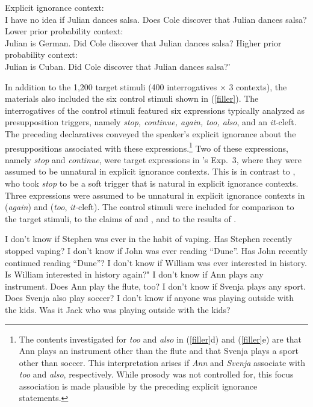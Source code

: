 \documentclass[11pt,fleqn]{article}
\newcommand{\6}{\mbox{$[\hspace*{-.6mm}[$}}
\newcommand{\9}{\mbox{$]\hspace*{-.6mm}]$}}
\newcommand{\citepos}[1]{\citeauthor{#1}'s \citeyear{#1}}
\begin{document}
\begin{exe}
\ex\label{sample}
\begin{xlist}
\ex Explicit ignorance context: \\ I have no idea if Julian dances salsa. Does Cole discover that Julian dances salsa?
\ex Lower prior probability context: \\ Julian is German. Did Cole discover that Julian dances salsa?
\ex Higher prior probability context: \\ Julian is Cuban. Did Cole discover that Julian dances salsa?'
\end{xlist}
\end{exe}

In addition to the 1,200 target stimuli (400 interrogatives $\times$ 3 contexts), the materials also included the six control stimuli shown in (\ref{filler}). The interrogatives of the control stimuli featured six expressions typically analyzed as presupposition triggers, namely {\em stop, continue, again, too, also}, and an {\em it-}cleft. The preceding declaratives conveyed the speaker's explicit ignorance about the presuppositions associated with these expressions.\footnote{The contents investigated for {\em too} and {\em also} in (\ref{filler}d) and (\ref{filler}e) are that Ann plays an instrument other than the flute and that Svenja plays a sport other than soccer. This interpretation arises if {\em Ann} and {\em Svenja} associate with {\em too} and {\em also}, respectively. While prosody was not controlled for, this focus association is made plausible by the preceding explicit ignorance statements.} Two of these expressions, namely {\em stop} and {\em continue}, were target expressions in \citepos{mandelkern-etal2020} Exp.~3, where they were assumed to be unnatural in explicit ignorance contexts. This is in contrast to \citealt{simons01}, who took {\em stop} to be a soft trigger that is natural in explicit ignorance contexts. Three expressions were assumed to be unnatural in explicit ignorance contexts in \citealt{simons01} ({\em again}) and \citealt{abusch10} ({\em too}, {\em it-}cleft). The control stimuli were included for comparison to the target stimuli, to the claims of \citealt{simons01} and \citealt{abusch10}, and to the results of \citealt{mandelkern-etal2020}.

\begin{exe}
\ex\label{filler} 
\begin{xlist}
\ex I don't know if Stephen was ever in the habit of vaping. Has Stephen recently stopped vaping?
\ex I don't know if John was ever reading ``Dune''. Has John recently continued reading ``Dune''?
\ex I don't know if William was ever interested in history. Is William interested in history again?"
\ex I don't know if Ann plays any instrument. Does Ann play the flute, too?
\ex I don't know if Svenja plays any sport. Does Svenja also play soccer?
\ex I don't know if anyone was playing outside with the kids. Was it Jack who was playing outside with the kids?

\end{xlist}
\end{exe}
\end{document}
